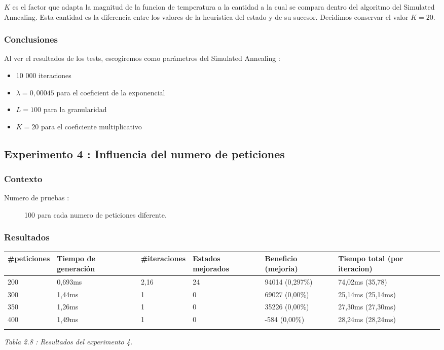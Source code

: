 \documentclass{article}
\begin{document}
$K$ es el factor que adapta la magnitud de la funcion de temperatura a la
cantidad a la cual se compara dentro del algoritmo del Simulated Annealing. Esta
cantidad es la diferencia entre los valores de la heuristica del estado y de su
sucesor. Decidimos conservar el valor $K=20$.

\subsubsection{Conclusiones}

Al ver el resultados de los tests, escogiremos como parámetros del Simulated
Annealing :
\begin{itemize}
\item 10 000 iteraciones
\item $\lambda = 0,00045$ para el coeficient de la exponencial
\item $L=100$ para la granularidad
\item $K=20$ para el coeficiente multiplicativo
\end{itemize}

\subsection{Experimento 4 : Influencia del numero de peticiones}

\subsubsection{Contexto}
\begin{description}
\item[Numero de pruebas :] 100 para cada numero de peticiones diferente.
\end{description}

\subsubsection{Resultados}

\begin{center}
\begin{tabular}{|l|l|l|l|l|l|}
\hline
\#peticiones & Tiempo de generación & \#iteraciones & Estados mejorados &
Beneficio (mejoria) & Tiempo total (por iteracion)\\
\hline
200 & 0,693ms & 2,16 & 24 & 94014 (0,297\%) & 74,02ms (35,78)\\
\hline
300 & 1,44ms & 1 & 0 & 69027 (0,00\%) & 25,14ms (25,14ms)\\
\hline
350 & 1,26ms & 1 & 0 & 35226 (0,00\%) & 27,30ms (27,30ms)\\
\hline
400 & 1,49ms & 1 & 0 & -584 (0,00\%) & 28,24ms (28,24ms)\\
\hline\\
\end{tabular}
{\it Tabla 2.8 : Resultados del experimento 4.}
\end{center}
\end{document}
